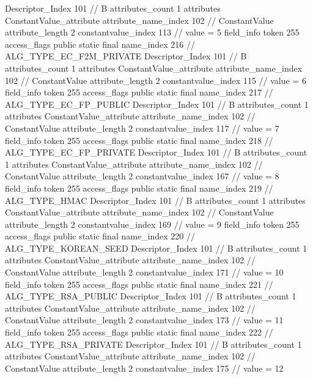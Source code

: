 {{{{{				Descriptor_Index	101		// B
				attributes_count	1
				attributes {
				ConstantValue_attribute {
					attribute_name_index	102		// ConstantValue
					attribute_length	2
					constantvalue_index	113		// value = 5
				}
				}
			}
			field_info {
				token	255
				access_flags	public static final
				name_index	216		// ALG_TYPE_EC_F2M_PRIVATE
				Descriptor_Index	101		// B
				attributes_count	1
				attributes {
				ConstantValue_attribute {
					attribute_name_index	102		// ConstantValue
					attribute_length	2
					constantvalue_index	115		// value = 6
				}
				}
			}
			field_info {
				token	255
				access_flags	public static final
				name_index	217		// ALG_TYPE_EC_FP_PUBLIC
				Descriptor_Index	101		// B
				attributes_count	1
				attributes {
				ConstantValue_attribute {
					attribute_name_index	102		// ConstantValue
					attribute_length	2
					constantvalue_index	117		// value = 7
				}
				}
			}
			field_info {
				token	255
				access_flags	public static final
				name_index	218		// ALG_TYPE_EC_FP_PRIVATE
				Descriptor_Index	101		// B
				attributes_count	1
				attributes {
				ConstantValue_attribute {
					attribute_name_index	102		// ConstantValue
					attribute_length	2
					constantvalue_index	167		// value = 8
				}
				}
			}
			field_info {
				token	255
				access_flags	public static final
				name_index	219		// ALG_TYPE_HMAC
				Descriptor_Index	101		// B
				attributes_count	1
				attributes {
				ConstantValue_attribute {
					attribute_name_index	102		// ConstantValue
					attribute_length	2
					constantvalue_index	169		// value = 9
				}
				}
			}
			field_info {
				token	255
				access_flags	public static final
				name_index	220		// ALG_TYPE_KOREAN_SEED
				Descriptor_Index	101		// B
				attributes_count	1
				attributes {
				ConstantValue_attribute {
					attribute_name_index	102		// ConstantValue
					attribute_length	2
					constantvalue_index	171		// value = 10
				}
				}
			}
			field_info {
				token	255
				access_flags	public static final
				name_index	221		// ALG_TYPE_RSA_PUBLIC
				Descriptor_Index	101		// B
				attributes_count	1
				attributes {
				ConstantValue_attribute {
					attribute_name_index	102		// ConstantValue
					attribute_length	2
					constantvalue_index	173		// value = 11
				}
				}
			}
			field_info {
				token	255
				access_flags	public static final
				name_index	222		// ALG_TYPE_RSA_PRIVATE
				Descriptor_Index	101		// B
				attributes_count	1
				attributes {
				ConstantValue_attribute {
					attribute_name_index	102		// ConstantValue
					attribute_length	2
					constantvalue_index	175		// value = 12
}}}}}}}

